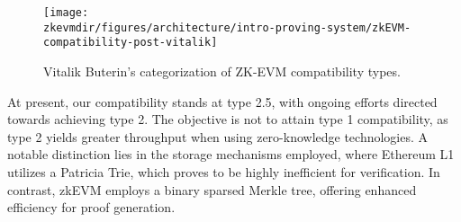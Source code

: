 \begin{figure}[H]
\centering
\texttt{[image: \\zkevmdir/figures/architecture/intro-proving-system/zkEVM-compatibility-post-vitalik]}
\caption{Vitalik Buterin's categorization of ZK-EVM compatibility types.}
\label{fig:zkEVM-compatibility-post-vitalik}
\end{figure}

At present, our compatibility stands at type 2.5, with ongoing efforts directed towards achieving type 2. The objective is not to attain type 1 compatibility, as type 2 yields greater throughput when using zero-knowledge technologies. A notable distinction lies in the storage mechanisms employed, where Ethereum L1 utilizes a Patricia Trie, which proves to be highly inefficient for verification. In contrast, zkEVM employs a binary sparsed Merkle tree, offering enhanced efficiency for proof generation.


